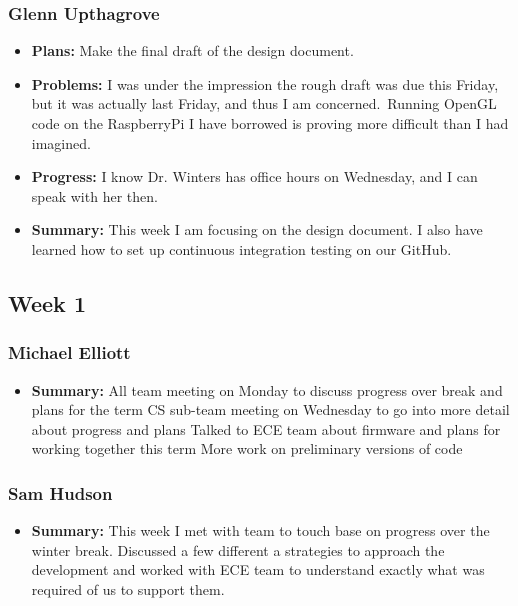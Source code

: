 \documentclass[onecolumn, draftclsnofoot,10pt, compsoc]{IEEEtran}
\begin{document}
\subsubsection{Glenn Upthagrove}
\begin {itemize}
 \item \textbf{Plans: }Make the final draft of the design document. 
 \item \textbf{Problems: }I was under the impression the rough draft was due this Friday, but it was actually last Friday, and thus I am concerned. Running OpenGL code on the RaspberryPi I have borrowed is proving more difficult than I had imagined.
 \item \textbf{Progress: }I know Dr. Winters has office hours on Wednesday, and I can speak with her then.
 \item \textbf{Summary: }This week I am focusing on the design document. I also have learned how to set up continuous integration testing on our GitHub.
\end {itemize}

\subsection {Week 1}
\subsubsection{Michael Elliott}
\begin {itemize}
\item \textbf{Summary: }
All team meeting on Monday to discuss progress over break and plans for the term
CS sub-team meeting on Wednesday to go into more detail about progress and plans
Talked to ECE team about firmware and plans for working together this term
More work on preliminary versions of code
\end {itemize}
\subsubsection{Sam Hudson}
\begin {itemize}
\item \textbf{Summary: }This week I met with team to touch base on progress over the winter break. Discussed a few different a strategies to approach the development and worked with ECE team to understand exactly what was required of us to support them.
\end {itemize}
\end{document}
